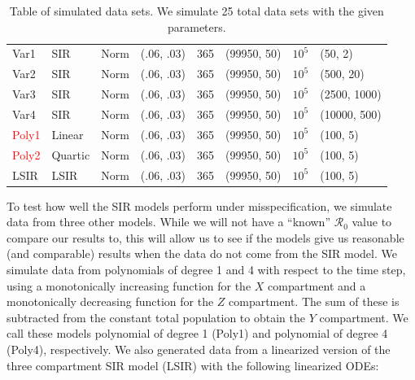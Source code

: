 \documentclass[12pt]{article}
\newcommand{\rr}{\ensuremath{\mathcal{R}_0}}
\begin{document}
\begin{table}[]
\begin{tabular}{@{}llllllll@{}}
 \midrule
  Var1      & SIR      &   Norm             & (.06, .03)                          &     365       &  (99950, 50)                    &  $10^5$          &(50, 2)                                \\
  Var2      & SIR      &   Norm             & (.06, .03)                          &     365       &  (99950, 50)                    &  $10^5$          &(500, 20)                                \\
  Var3      & SIR      &   Norm             & (.06, .03)                          &     365       &  (99950, 50)                    &  $10^5$          &(2500, 1000)                                \\
  Var4      & SIR      &   Norm             & (.06, .03)                          &     365       &  (99950, 50)                    &  $10^5$          &(10000, 500)                                \\ \midrule
  \textcolor{red}{Poly1}     & Linear      &   Norm             & (.06, .03)                          &     365       &  (99950, 50)                    &  $10^5$          &(100, 5)                            \\
  \textcolor{red}{Poly2}    & Quartic      &   Norm             & (.06, .03)                          &     365       &  (99950, 50)                    &  $10^5$          &(100, 5)                            \\ 
   LSIR     & LSIR      &   Norm             & (.06, .03)                          &     365       &  (99950, 50)                    &  $10^5$          &(100, 5)                            \\ 
  \bottomrule
\end{tabular}
\caption{Table of simulated data sets.  We simulate 25 total data sets with the given parameters.}
\label{tab:simulated-data}
\end{table}

To test how well the SIR models perform under misspecification, we simulate data from three other models. While we will not have a ``known'' $\rr$ value to compare our results to, this will allow us to see if the models give us reasonable (and comparable) results when the data do not come from the SIR model. We simulate data from polynomials of degree 1 and 4 with respect to the time step, using a monotonically increasing function for the $X$ compartment and a monotonically decreasing function for the $Z$ compartment.   The sum of these is subtracted from the constant total population to obtain the $Y$ compartment. We call these models polynomial of degree 1 (Poly1) and polynomial of degree 4 (Poly4), respectively. We also generated data from a linearized version of the three compartment SIR model (LSIR) with the following linearized ODEs:
\end{document}
